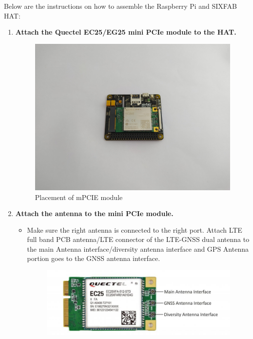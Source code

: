 \documentclass[12pt, letterpaper]{article}
\begin{document}
\par Below are the instructions on how to assemble the Raspberry Pi and SIXFAB HAT:

\begin{enumerate}[label=\large{\textbf{\arabic*}.}]
	\item \textbf{\large{Attach the Quectel EC25/EG25 mini PCIe module to the HAT.}}
	\begin{figure}[h!]
	\centering
	\includegraphics[width=1\columnwidth]{assets/Raspberry-Pi-Base-HAT-Quectel-Getting-Started-1-scaled.jpg}
	\caption{Placement of mPCIE module}
	\end{figure}	
	\item \textbf{\large{Attach the antenna to the mini PCIe module.}}
	\begin{itemize}
	\item Make sure the right antenna is connected to the right port. Attach LTE full band PCB antenna/LTE connector of the LTE-GNSS dual antenna to the main Antenna interface/diversity antenna interface and GPS Antenna portion goes to the GNSS antenna interface.
	\begin{figure}[h!]
	\centering
	\includegraphics[width=1\columnwidth]{assets/e4f78fd-EC25_Antenna_ports-848x300.jpg}

\end{figure}
\end{itemize}
\end{enumerate}
\end{document}
